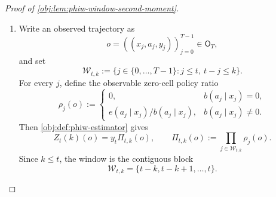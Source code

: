 \documentclass[11pt]{article}
\begin{document}
\begin{proof}[Proof of \cref{obj:lem:phiw-window-second-moment}]
\begin{enumerate}
\item
Write an observed trajectory as
\[
o=((x_j,a_j,y_j))_{j=0}^{T-1}\in \mathsf O_T,
\]
and set
\[
\mathcal W_{t,k}
:=
\{j\in\{0,\ldots,T-1\}: j\le t,\ t-j\le k\}.
\]
For every \(j\), define the observable zero-cell policy ratio
\[
\rho_j(o)
:=
\begin{cases}
0, & b(a_j\mid x_j)=0,\\[2mm]
e(a_j\mid x_j)/b(a_j\mid x_j), & b(a_j\mid x_j)\ne 0.
\end{cases}
\]
Then \cref{obj:def:phiw-estimator} gives
\[
Z_t(k)(o)=y_t\Pi_{t,k}(o),
\qquad
\Pi_{t,k}(o):=\prod_{j\in\mathcal W_{t,k}}\rho_j(o).
\]
Since \(k\le t\), the window is the contiguous block
\[
\mathcal W_{t,k}=\{t-k,t-k+1,\ldots,t\}.
\]


\end{enumerate}
\end{proof}
\end{document}
